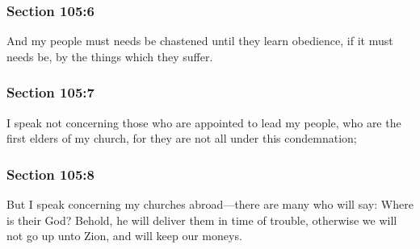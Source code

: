 	\subsubsection{Section 105:6} %
		\label{DC105-6}

		And my people must needs be chastened until they learn obedience, if it must needs be, by the things which they suffer.


	\subsubsection{Section 105:7} %
		\label{DC105-7}

		I speak not concerning those who are appointed to lead my people, who are the first elders of my church, for they are not all under this condemnation;


	\subsubsection{Section 105:8} %
		\label{DC105-8}

		But I speak concerning my churches abroad—there are many who will say: Where is their God?  Behold, he will deliver them in time of trouble, otherwise we will not go up unto Zion, and will keep our moneys.


